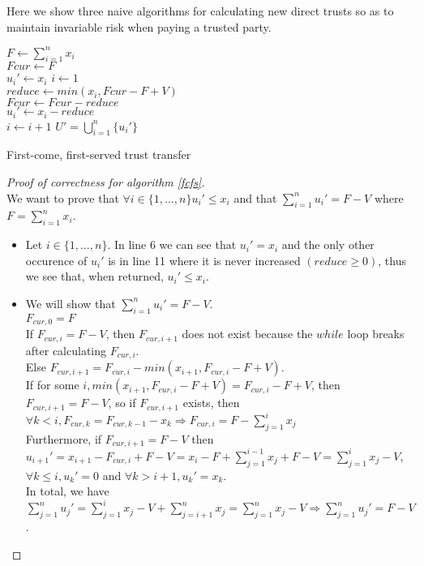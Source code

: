 \documentclass[11pt]{article}
\theoremstyle{definition}
\theoremstyle{corollary}
\begin{document}
    Here we show three naive algorithms for calculating new direct trusts so as to maintain invariable risk when paying
    a trusted party. \\
    \begin{algorithm}[H]
       \label{fcfs}
       $F \gets \sum\limits_{i=1}^{n}x_i$ \\
       $Fcur \gets F$ \\
          {$u_i' \gets x_i$} 
       $i \gets 1$ \\
          {$reduce \gets min(x_i, Fcur - F + V)$ \\
           $Fcur \gets Fcur - reduce$ \\
           $u_i' \gets x_i - reduce$ \\
           $i \gets i + 1$}
       \Return $U' = \bigcup\limits_{i=1}^{n}\{u_i'\}$
       \caption{First-come, first-served trust transfer}
    \end{algorithm}
    \begin{proof}[Proof of correctness for algorithm \ref{fcfs}] \ \\
       We want to prove that $\forall i \in \{1,...,n\} u_i' \leq x_i$ and that $\sum\limits_{i=1}^{n}u_i' = F - V$
       where $F = \sum\limits_{i=1}^{n}x_i$.
       \begin{itemize}
          \item Let $i \in \{1,...,n\}$. In line 6 we can see that $u_i' = x_i$ and the only other occurence of $u_i'$
          is in line 11 where it is never increased $(reduce \geq 0)$, thus we see that, when returned, $u_i' \leq x_i$.
          \item We will show that $\sum\limits_{i=1}^{n}u_i' = F - V$. \\
          $F_{cur,0} = F$ \\
          If $F_{cur,i} = F - V$, then $F_{cur,i+1}$ does not exist because the $while$ loop breaks after calculating
          $F_{cur,i}$. \\
          Else $F_{cur,i+1} = F_{cur,i} - min(x_{i+1}, F_{cur,i} - F + V)$. \\
          If for some $i, min(x_{i+1}, F_{cur,i} - F + V) = F_{cur,i} - F + V$, then $F_{cur,i+1} = F - V$, so if
          $F_{cur,i+1}$ exists, then $\forall k < i, F_{cur,k} = F_{cur,k-1} - x_k \Rightarrow F_{cur,i} =
          F - \sum\limits_{j=1}^{i}x_j$ \\
          Furthermore, if $F_{cur,i+1} = F - V$ then $u_{i+1}' = x_{i+1} - F_{cur,i} + F - V =
          x_i - F + \sum\limits_{j=1}^{i-1}x_j + F - V = \sum\limits_{j=1}^{i}x_j - V$, $\forall k \leq i, u_k' = 0$
          and $\forall k > i+1, u_k' = x_k$. \\
          In total, we have $\sum\limits_{j=1}^{n}u_j' = \sum\limits_{j=1}^{i}x_j - V + \sum\limits_{j=i+1}^{n}x_j =
          \sum\limits_{j=1}^{n}x_j - V \Rightarrow \sum\limits_{j=1}^{n}u_j' = F - V$.
       \end{itemize}
    \end{proof}
\end{document}
